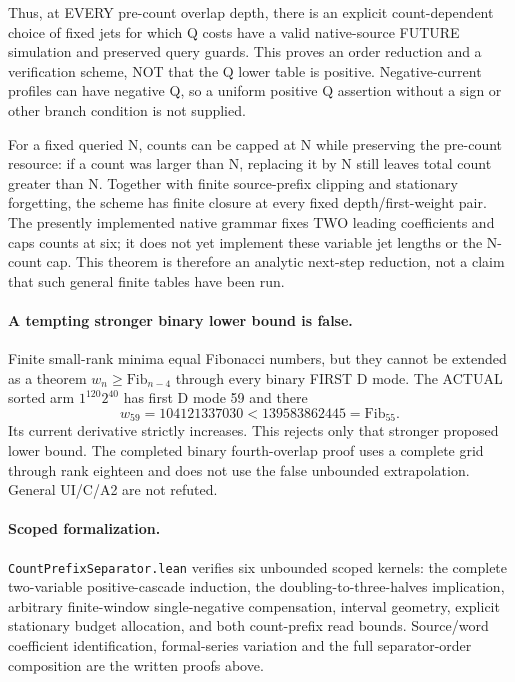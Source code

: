 Thus, at EVERY pre-count overlap depth, there is an explicit
count-dependent choice of fixed jets for which Q costs have a valid
native-source FUTURE simulation and preserved query guards.
This proves an order reduction and a verification scheme, NOT that
the Q lower table is positive. Negative-current profiles can have
negative Q, so a uniform positive Q assertion without a sign or
other branch condition is not supplied.

For a fixed queried N, counts can be capped at N while preserving
the pre-count resource: if a count was larger than N, replacing it
by N still leaves total count greater than N. Together with finite
source-prefix clipping and stationary forgetting, the scheme has
finite closure at every fixed depth/first-weight pair. The presently
implemented native grammar fixes TWO leading coefficients and caps
counts at six; it does not yet implement these variable jet lengths
or the N-count cap. This theorem is therefore an analytic next-step
reduction, not a claim that such general finite tables have been run.

\paragraph{A tempting stronger binary lower bound is false.}
Finite small-rank minima equal Fibonacci numbers, but they cannot be
extended as a theorem $w_n\ge\mathrm{Fib}_{n-4}$ through every binary
FIRST D mode. The ACTUAL sorted arm $1^{120}2^{40}$ has first D mode
59 and there
\[
 w_{59}=104121337030<139583862445=\mathrm{Fib}_{55}.
\]
Its current derivative strictly increases. This rejects only that
stronger proposed lower bound. The completed binary fourth-overlap
proof uses a complete grid through rank eighteen and does not use the
false unbounded extrapolation. General UI/C/A2 are not refuted.

\paragraph{Scoped formalization.}
\texttt{CountPrefixSeparator.lean} verifies six unbounded scoped
kernels: the complete two-variable positive-cascade induction,
the doubling-to-three-halves implication, arbitrary finite-window
single-negative compensation, interval geometry, explicit stationary
budget allocation, and both count-prefix read bounds. Source/word
coefficient identification, formal-series variation and the full
separator-order composition are the written proofs above.

